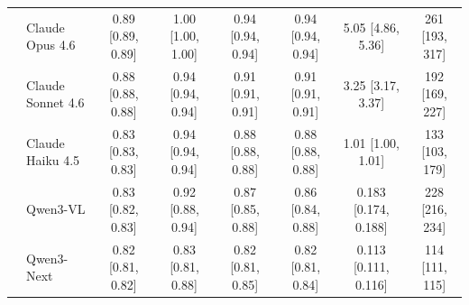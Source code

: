 \begin{tabular}{llcccccc}
  \addlinespace
    \multirow{5}{*}{\evgopt}
      & Claude Opus 4.6 & 0.89 [0.89, 0.89] & 1.00 [1.00, 1.00] & 0.94 [0.94, 0.94] & 0.94 [0.94, 0.94] & 5.05 [4.86, 5.36] & 261 [193, 317] \\
      & Claude Sonnet 4.6 & 0.88 [0.88, 0.88] & 0.94 [0.94, 0.94] & 0.91 [0.91, 0.91] & 0.91 [0.91, 0.91] & 3.25 [3.17, 3.37] & 192 [169, 227] \\
      & Claude Haiku 4.5 & 0.83 [0.83, 0.83] & 0.94 [0.94, 0.94] & 0.88 [0.88, 0.88] & 0.88 [0.88, 0.88] & 1.01 [1.00, 1.01] & 133 [103, 179] \\
      & Qwen3-VL & 0.83 [0.82, 0.83] & 0.92 [0.88, 0.94] & 0.87 [0.85, 0.88] & 0.86 [0.84, 0.88] & 0.183 [0.174, 0.188] & 228 [216, 234] \\
      & Qwen3-Next & 0.82 [0.81, 0.82] & 0.83 [0.81, 0.88] & 0.82 [0.81, 0.85] & 0.82 [0.81, 0.84] & 0.113 [0.111, 0.116] & 114 [111, 115] \\
  \bottomrule
\end{tabular}
